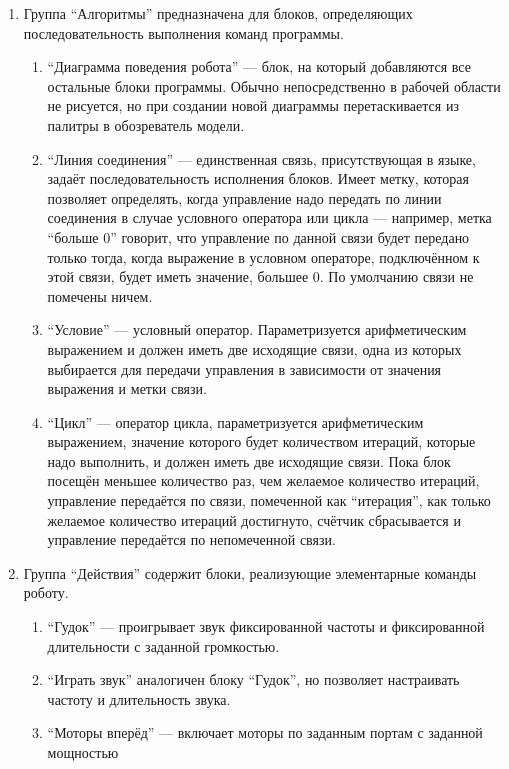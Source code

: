 \begin{enumerate}
	\item Группа "`Алгоритмы"' предназначена для блоков, определяющих последовательность 
		выполнения команд программы.
		\begin{enumerate}
			\item "`Диаграмма поведения робота"' --- блок, на который добавляются все остальные 
				блоки программы. Обычно непосредственно в рабочей области не рисуется, но 
				при создании новой диаграммы перетаскивается из палитры в обозреватель модели.
			\item "`Линия соединения"' --- единственная связь, присутствующая в языке, задаёт 
				последовательность исполнения блоков. Имеет метку, которая позволяет определять, 
				когда управление надо передать по линии соединения в случае условного оператора 
				или цикла --- например, метка "`больше 0"' говорит, что управление по данной 
				связи будет передано только тогда, когда выражение в условном операторе, подключённом 
				к этой связи, будет иметь значение, большее 0. По умолчанию связи не помечены ничем.
			\item "`Условие"' --- условный оператор. Параметризуется арифметическим выражением 
				и должен иметь две исходящие связи, одна из которых выбирается для передачи 
				управления в зависимости от значения выражения и метки связи.
			\item "`Цикл"' --- оператор цикла, параметризуется арифметическим выражением, 
				значение которого будет количеством итераций, которые надо выполнить, и должен 
				иметь две исходящие связи. Пока блок посещён меньшее количество раз, чем желаемое 
				количество итераций, управление передаётся по связи, помеченной как "`итерация"', 
				как только желаемое количество итераций достигнуто, счётчик сбрасывается и 
				управление передаётся по непомеченной связи.
		\end{enumerate}
	\item Группа "`Действия"' содержит блоки, реализующие элементарные команды роботу.
		\begin{enumerate}
			\item "`Гудок"' --- проигрывает звук фиксированной частоты и фиксированной длительности 
				с заданной громкостью.
			\item "`Играть звук"' аналогичен блоку "`Гудок"', но позволяет настраивать частоту 
				и длительность звука.
			\item "`Моторы вперёд"' --- включает моторы по заданным портам с заданной мощностью 

\end{enumerate}
\end{enumerate}

